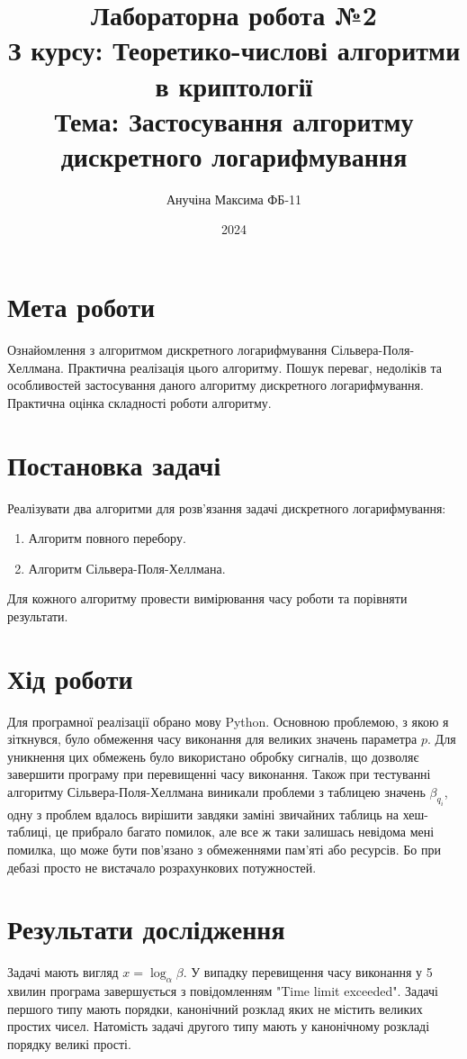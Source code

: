 \documentclass[12pt]{article}
\title{Лабораторна робота №2 \\ З курсу: Теоретико-числові алгоритми в криптології \\ Тема: Застосування алгоритму дискретного логарифмування}
\author{Анучіна Максима ФБ-11}
\date{2024}
\begin{document}
\maketitle

\section{Мета роботи}
Ознайомлення з алгоритмом дискретного логарифмування Сільвера-Поля-Хеллмана. Практична реалізація цього алгоритму. Пошук переваг, недоліків та особливостей застосування даного алгоритму дискретного логарифмування. Практична оцінка складності роботи алгоритму.

\section{Постановка задачі}
Реалізувати два алгоритми для розв'язання задачі дискретного логарифмування:
\begin{enumerate}
    \item Алгоритм повного перебору.
    \item Алгоритм Сільвера-Поля-Хеллмана.
\end{enumerate}
Для кожного алгоритму провести вимірювання часу роботи та порівняти результати.

\section{Хід роботи}
Для програмної реалізації обрано мову Python. Основною проблемою, з якою я зіткнувся, було обмеження часу виконання для великих значень параметра \( p \). Для уникнення цих обмежень було використано обробку сигналів, що дозволяє завершити програму при перевищенні часу виконання. Також при тестуванні алгоритму Сільвера-Поля-Хеллмана виникали проблеми з таблицею значень \( \beta_{q_i} \), одну з проблем вдалось вирішити завдяки заміні звичайних таблиць на хеш-таблиці, це прибрало багато помилок, але все ж таки залишась невідома мені помилка, що може бути пов'язано з обмеженнями пам'яті або ресурсів. Бо при дебазі просто не вистачало розрахункових потужностей.

\section{Результати дослідження}
Задачі мають вигляд \(x = \log_{\alpha} \beta\). У випадку перевищення часу виконання у 5 хвилин програма завершується з повідомленням "Time limit exceeded".
Задачі першого типу мають порядки, канонічний розклад яких не містить великих простих чисел. Натомість задачі другого типу мають у канонічному розкладі порядку великі прості.
\end{document}
